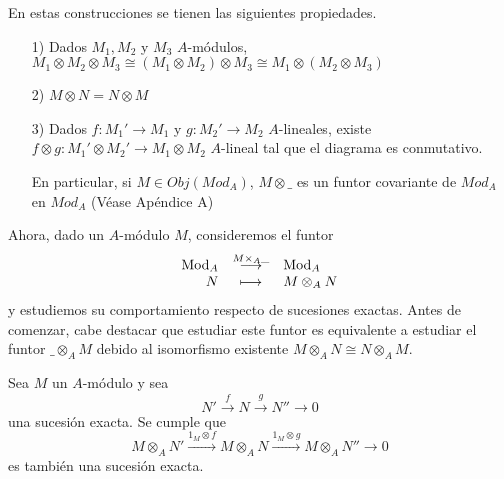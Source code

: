 \documentclass[../main.tex]{subfiles}
\begin{document}
En estas construcciones se tienen las siguientes propiedades.
\begin{itemize}
	\item [1)] Dados $M_1,M_2$ y $M_3$ $A$-módulos, $M_1\otimes  M_2\otimes M_3\cong(M_1\otimes  M_2)\otimes  M_3\cong M_1\otimes (M_2\otimes  M_3)$
	\item [2)] $M\otimes N=N\otimes M$
	\item [3)] Dados $f:M_1'\to M_1$ y $g:M_2'\to M_2$ $A$-lineales, existe $f\otimes g:M_1'\otimes  M_2'\rightarrow M_1\otimes M_2$ $A$-lineal tal que el diagrama es conmutativo.

	En particular, si $M\in Obj(Mod_A)$, $M\otimes\_$ es un funtor covariante de $Mod_A$ en $Mod_A$ (Véase Apéndice A)
\end{itemize}

Ahora, dado un $A$-módulo $M$, consideremos el funtor
$$\begin{array}{rcl}
\operatorname{Mod}_A&\overset{M\times_A\_}{\longrightarrow}&\operatorname{Mod}_A\\
N&\longmapsto&M\otimes_A N
\end{array}$$
y estudiemos su comportamiento respecto de sucesiones exactas. Antes de comenzar, cabe destacar que estudiar este funtor es equivalente a estudiar el funtor $\_\otimes_A M$ debido al isomorfismo existente $M\otimes_A N\cong N\otimes_A M$.

\begin{proposition}
	Sea $M$ un $A$-módulo y sea \begin{equation}\label{equation: ext1}
	N'\overset{f}{\longrightarrow}N\overset{g}{\longrightarrow}N''\longrightarrow 0
	\end{equation}una sucesión exacta. Se cumple que \begin{equation}\label{equation: ext2}
	M\otimes_A N'\overset{1_M\otimes f}{\longrightarrow}M\otimes_A N\overset{1_M\otimes g}{\longrightarrow}M\otimes_A N''\longrightarrow 0
	\end{equation} es también una sucesión exacta.
\end{proposition}
\end{document}
